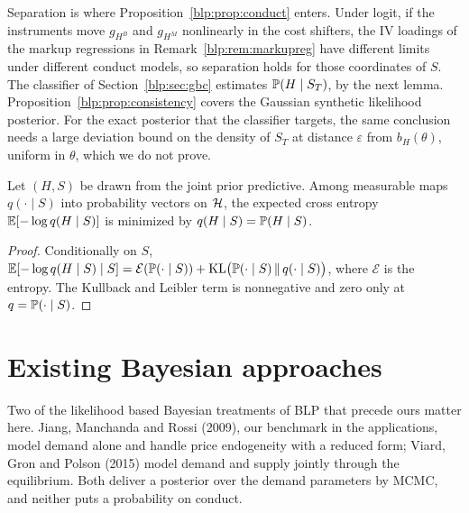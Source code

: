 Separation is where Proposition~\ref{blp:prop:conduct} enters. Under logit, if the instruments move
$g_{H^B}$ and $g_{H^M}$ nonlinearly in the cost shifters, the IV loadings of the
markup regressions in Remark~\ref{blp:rem:markupreg} have different limits under different conduct models, so separation holds for those coordinates of $S$. The classifier of Section~\ref{blp:sec:gbc} estimates $\mathbb{P}(H\mid S_T)$, by the next lemma. Proposition~\ref{blp:prop:consistency} covers the Gaussian synthetic likelihood posterior. For the exact posterior that the classifier targets, the same conclusion needs a large deviation bound on the density of $S_T$ at distance $\varepsilon$ from $b_H(\theta)$, uniform in $\theta$, which we do not prove.

\begin{lemma}\label{blp:lem:ce}
Let $(H,S)$ be drawn from the joint prior predictive. Among measurable maps $q(\cdot\mid S)$ into
probability vectors on $\mathcal{H}$, the expected cross entropy $\mathbb{E}[-\log q(H\mid S)]$ is minimized by
$q(H\mid S) = \mathbb{P}(H\mid S)$.
\end{lemma}
\begin{proof}
Conditionally on $S$, $\mathbb{E}[-\log q(H\mid S)\mid S] = \mathcal E(\mathbb{P}(\cdot\mid S)) +
\mathrm{KL}\bigl(\mathbb{P}(\cdot\mid S)\,\Vert\, q(\cdot\mid S)\bigr)$, where $\mathcal E$ is the
entropy. The Kullback and Leibler term is nonnegative and zero only at $q = \mathbb{P}(\cdot\mid S)$.
\end{proof}

\section{Existing Bayesian approaches}\label{blp:sec:existing}

Two of the likelihood based Bayesian treatments of BLP that precede ours matter here. Jiang, Manchanda and Rossi (2009), our benchmark in the applications, model demand alone and handle price endogeneity with a reduced form; Viard, Gron and Polson (2015) model demand and supply jointly through the equilibrium. Both deliver a posterior over the demand parameters by MCMC, and neither puts a probability on conduct.

